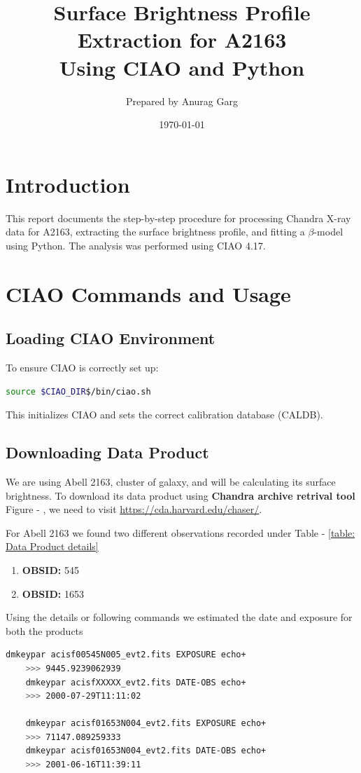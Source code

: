 \documentclass[a4paper,12pt]{article}
\title{Surface Brightness Profile Extraction for A2163 \\ Using CIAO and Python}
\author{Prepared by Anurag Garg}
\date{\today}
\begin{document}
\maketitle

\section{Introduction}
This report documents the step-by-step procedure for processing Chandra X-ray data for A2163, extracting the surface brightness profile, and fitting a $\beta$-model using Python. The analysis was performed using CIAO 4.17.

\section{CIAO Commands and Usage}

\subsection{Loading CIAO Environment}
To ensure CIAO is correctly set up:
\begin{lstlisting}[language=bash]
source $CIAO_DIR$/bin/ciao.sh
\end{lstlisting}
This initializes CIAO and sets the correct calibration database (CALDB).

\subsection{Downloading Data Product}
We are using Abell 2163, cluster of galaxy, and will be calculating its surface brightness. To download its data product using \textbf{Chandra archive retrival tool} Figure - \label{fig:Chanda Archive reterival tool}, we need to visit \url{https://cda.harvard.edu/chaser/}.

For Abell 2163 we found two different observations recorded under Table - \ref{table: Data Product details}
\begin{enumerate}
    \item \textbf{OBSID:} 545
    \item \textbf{OBSID:} 1653
\end{enumerate}

Using the details or following commands we estimated the date and exposure for both the products

\begin{lstlisting}[language=bash]
    dmkeypar acisf00545N005_evt2.fits EXPOSURE echo+
    >>> 9445.9239062939
    dmkeypar acisfXXXXX_evt2.fits DATE-OBS echo+
    >>> 2000-07-29T11:11:02

    dmkeypar acisf01653N004_evt2.fits EXPOSURE echo+
    >>> 71147.089259333
    dmkeypar acisf01653N004_evt2.fits DATE-OBS echo+
    >>> 2001-06-16T11:39:11
\end{lstlisting}
\end{document}

